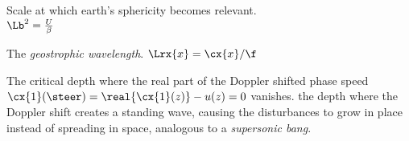 \begin{fullwidth}
\begin{multicols}{2}
\begin{definition}\label{def:Lb}
Scale at which earth's sphericity becomes relevant.\\
$\Lb^2 = \frac{U}{\beta} $
\end{definition}
\begin{definition}\label{def:Lr}
The \textit{geostrophic wavelength}.
$\Lrx{x} = \cx{x}/\f $
\end{definition}
\begin{definition}\label{def:steer}
The critical depth where the real part of the Doppler shifted phase
speed\\ $\cx{1}(\steer)=\real{\cx{1}(z)}-u(z)=0$ vanishes. \Ie the depth where the Doppler shift
creates a standing wave, causing the disturbances to grow in place instead of
spreading in space, analogous to a \textit{supersonic bang}.
\end{definition}




\end{multicols}
\end{fullwidth}
